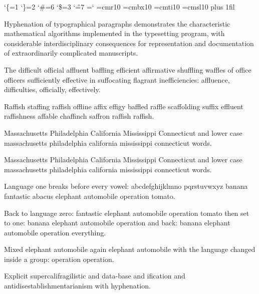 \catcode`\{=1 \catcode`\}=2 \catcode`\#=6 \catcode`\$=3 \catcode`\^=7
=`\-
\font\tenrm=cmr10 \font\tenbf=cmbx10 \font\tenit=cmti10 \font\tensl=cmsl10
\tenrm \hsize=150pt \vsize=650pt \parindent=10pt \baselineskip=12pt
\topskip=10pt \maxdepth=2pt  
   
 \parfillskip=0pt plus 1fil 
  

Hyphenation of typographical paragraphs demonstrates the characteristic
mathematical algorithms implemented in the typesetting program, with
considerable interdisciplinary consequences for representation and
documentation of extraordinarily complicated manuscripts.

The difficult official affluent baffling efficient affirmative shuffling
waffles of office officers sufficiently effective in suffocating flagrant
inefficiencies: affluence, difficulties, officially, effectively.

 
Raffish staffing raffish offline affix effigy baffled raffle scaffolding
suffix effluent raffishness affable chaffinch saffron raffish raffish.

  
Massachusetts Philadelphia California Mississippi Connecticut and lower
case massachusetts philadelphia california mississippi connecticut words.

Massachusetts Philadelphia California Mississippi Connecticut and lower
case massachusetts philadelphia california mississippi connecticut words.

  
Language one breaks before every vowel: abcdefghijklmno pqrstuvwxyz
banana fantastic abacus elephant automobile operation tomato.

  
Back to language zero: fantastic elephant automobile operation tomato
 then set to one: banana elephant automobile operation
 and back: banana elephant automobile operation everything.

Mixed { elephant automobile} again elephant automobile with
the language changed inside a group: operation { operation}.

Explicit super\-cali\-fragilistic and data-base and
ification and
anti\discretionary{-}{}{}disestablishmentarianism with hyphenation.

